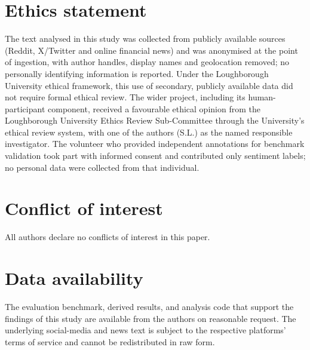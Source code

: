 \documentclass{aims}
\numberwithin{equation}{section}
\begin{document}
\section*{Ethics statement}
The text analysed in this study was collected from publicly available sources
(Reddit, X/Twitter and online financial news) and was anonymised at the point of
ingestion, with author handles, display names and geolocation removed; no
personally identifying information is reported. Under the Loughborough University
ethical framework, this use of secondary, publicly available data did not require
formal ethical review. The wider project, including its human-participant component,
received a favourable ethical opinion from the Loughborough University Ethics Review
Sub-Committee through the University's ethical review system, with one of the
authors (S.L.) as the named responsible investigator. The volunteer who provided
independent annotations for
benchmark validation took part with informed consent and contributed only sentiment
labels; no personal data were collected from that individual.

\section*{Conflict of interest}
All authors declare no conflicts of interest in this paper.

\section*{Data availability}
The evaluation benchmark, derived results, and analysis code that support the
findings of this study are available from the authors on reasonable request. The
underlying social-media and news text is subject to the respective platforms' terms
of service and cannot be redistributed in raw form.


\providecommand{\href}[2]{#2}
\providecommand{\arxiv}[1]{\href{http://arxiv.org/abs/#1}{arXiv:#1}}
\providecommand{\url}[1]{\texttt{#1}}
\providecommand{\urlprefix}{URL }
\end{document}
